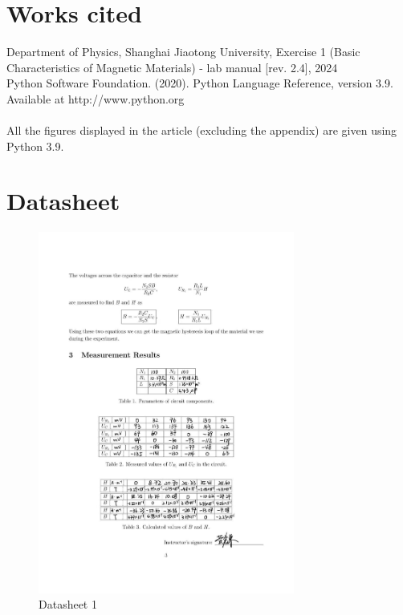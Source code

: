 \documentclass[12pt, a4paper, oneside]{article}
\begin{document}
\section{Works cited}
Department of Physics, Shanghai Jiaotong University, Exercise 1 (Basic Characteristics of Magnetic Materials) - lab manual [rev. 2.4], 2024\\
Python Software Foundation. (2020). Python Language Reference, version 3.9. Available at http://www.python.org\\
\\
All the figures displayed in the article (excluding the appendix) are given using Python 3.9.
\pagebreak
\appendix
\section{Datasheet}

\begin{figure}[htbp]
	\centering
	\includegraphics[width=0.75\textwidth]{D1.jpg}
	\caption{Datasheet 1}
\end{figure}


\end{document}
